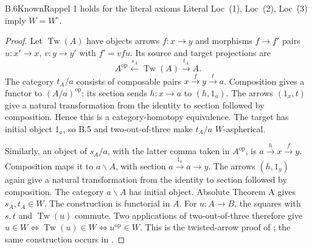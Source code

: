 \begin{claim}{B.6}{Known}{Rappel 1 holds for the literal axioms}
Literal Loc~(1), Loc~(2), Loc~(3) imply $W=W^\circ$.
\end{claim}
\begin{proof}
Let $\operatorname{Tw}(A)$ have objects arrows $f:x\to y$ and
morphisms $f\to f'$ pairs $u:x'\to x$, $v:y\to y'$ with $f'=vfu$.
Its source and target projections are
\[
 A^{\mathrm{op}}\xleftarrow{s_A}\operatorname{Tw}(A)
       \xrightarrow{t_A}A.
\]
The category $t_A/a$ consists of composable pairs $x\xrightarrow f y
\xrightarrow t a$. Composition gives a functor to $(A/a)^{\mathrm{op}}$;
its section sends $h:x\to a$ to $(h,1_a)$. The arrows
$(1_x,t)$ give a natural transformation from the identity to section
followed by composition. Hence this is a category-homotopy equivalence.
The target has initial object $1_a$, so B.5 and two-out-of-three make
$t_A/a$ $W$-aspherical.

Similarly, an object of $s_A/a$, with the latter comma taken in
$A^{\mathrm{op}}$, is $a\xrightarrow h x\xrightarrow f y$.
Composition maps it to $a\backslash A$, with section
$a\xrightarrow{1_a}a\to y$. The arrows $(h,1_y)$ again give a
natural transformation from the identity to section followed by
composition. The category $a\backslash A$ has initial object.
Absolute Theorem A gives $s_A,t_A\in W$. The construction is functorial
in $A$. For $u:A\to B$, the squares with $s,t$ and
$\operatorname{Tw}(u)$ commute. Two applications of two-out-of-three
therefore give $u\in W\Longleftrightarrow\operatorname{Tw}(u)\in W
\Longleftrightarrow u^{\mathrm{op}}\in W$.
This is the twisted-arrow proof of
\citet[Proposition~1.1.21 in the March 2020 version]{RESMalts2020};
the same construction occurs in \citet[\S1, p.~94]{RESQuillen1973}.
\end{proof}

